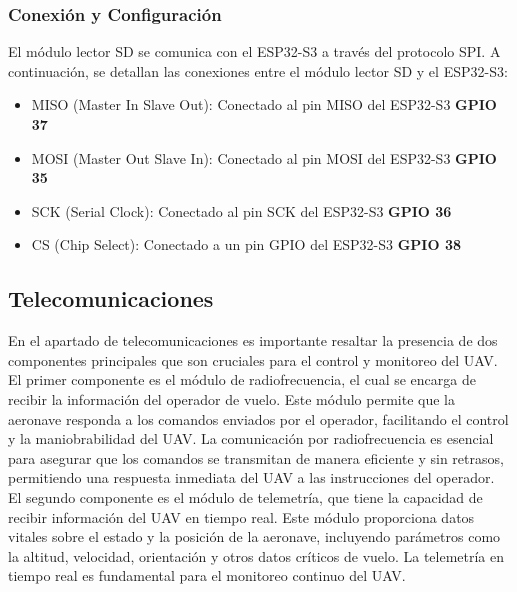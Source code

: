    \subsubsection{Conexión y Configuración} 

        El módulo lector SD se comunica con el ESP32-S3 a través del protocolo SPI. A continuación, se detallan las conexiones entre el módulo lector SD y el ESP32-S3:

        \begin{itemize}
            \item MISO (Master In Slave Out): Conectado al pin MISO del ESP32-S3   \textbf{GPIO 37}
            \item MOSI (Master Out Slave In): Conectado al pin MOSI del ESP32-S3  \textbf{GPIO 35}
            \item SCK (Serial Clock): Conectado al pin SCK del ESP32-S3        \textbf{GPIO 36}
            \item CS (Chip Select): Conectado a un pin GPIO del ESP32-S3       \textbf{GPIO 38}
        \end{itemize} 

\subsection{Telecomunicaciones}

    En el apartado de telecomunicaciones es importante resaltar la presencia de dos componentes principales que son cruciales para el control y monitoreo del UAV. \\ 

    El primer componente es el módulo de radiofrecuencia, el cual se encarga de recibir la información del operador de vuelo. Este módulo permite que la aeronave responda a los comandos enviados por el operador, facilitando el control y la maniobrabilidad del UAV. La comunicación por radiofrecuencia es esencial para asegurar que los comandos se transmitan de manera eficiente y sin retrasos, permitiendo una respuesta inmediata del UAV a las instrucciones del operador.\\ 

    El segundo componente es el módulo de telemetría, que tiene la capacidad de recibir información del UAV en tiempo real. Este módulo proporciona datos vitales sobre el estado y la posición de la aeronave, incluyendo parámetros como la altitud, velocidad, orientación y otros datos críticos de vuelo. La telemetría en tiempo real es fundamental para el monitoreo continuo del UAV.\\ 
